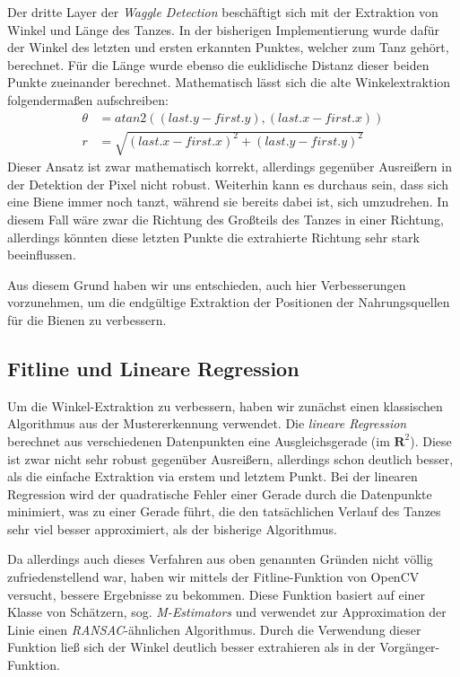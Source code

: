 \documentclass[11pt,a4paper]{article}
\begin{document}
Der dritte Layer der \textit{Waggle Detection} beschäftigt sich mit der Extraktion von Winkel und Länge des Tanzes.
In der bisherigen Implementierung wurde dafür der Winkel des letzten und ersten erkannten Punktes, welcher zum Tanz gehört, berechnet. Für die Länge wurde ebenso die euklidische Distanz dieser beiden Punkte zueinander berechnet.
Mathematisch lässt sich die alte Winkelextraktion folgendermaßen aufschreiben:
\begin{align}
\theta &= atan2((last.y-first.y), (last.x-first.x)) \\
r &= \sqrt{(last.x-first.x)^2 + (last.y-first.y)^2}
\end{align}
Dieser Ansatz ist zwar mathematisch korrekt, allerdings gegenüber Ausreißern in der Detektion der Pixel nicht robust.
Weiterhin kann es durchaus sein, dass sich eine Biene immer noch tanzt, während sie bereits dabei ist, sich umzudrehen. In diesem Fall wäre zwar die Richtung des Großteils des Tanzes in einer Richtung, allerdings könnten diese letzten Punkte die extrahierte Richtung sehr stark beeinflussen.

Aus diesem Grund haben wir uns entschieden, auch hier Verbesserungen vorzunehmen, um die endgültige Extraktion der Positionen der Nahrungsquellen für die Bienen zu verbessern.

\subsection{Fitline und Lineare Regression}%

Um die Winkel-Extraktion zu verbessern, haben wir zunächst einen klassischen Algorithmus aus der Mustererkennung verwendet. Die \textit{lineare Regression} berechnet aus verschiedenen Datenpunkten eine Ausgleichsgerade (im $\mathbf{R}^2$). Diese ist zwar nicht sehr robust gegenüber Ausreißern, allerdings schon deutlich besser, als die einfache Extraktion via erstem und letztem Punkt.
Bei der linearen Regression wird der quadratische Fehler einer Gerade durch die Datenpunkte minimiert, was zu einer Gerade führt, die den tatsächlichen Verlauf des Tanzes sehr viel besser approximiert, als der bisherige Algorithmus.

Da allerdings auch dieses Verfahren aus oben genannten Gründen nicht völlig zufriedenstellend war, haben wir mittels der Fitline-Funktion von OpenCV versucht, bessere Ergebnisse zu bekommen.
Diese Funktion basiert auf einer Klasse von Schätzern, sog. \textit{M-Estimators} und verwendet zur Approximation der Linie einen \textit{RANSAC}-ähnlichen Algorithmus.
Durch die Verwendung dieser Funktion ließ sich der Winkel deutlich besser extrahieren als in der Vorgänger-Funktion.
\end{document}
